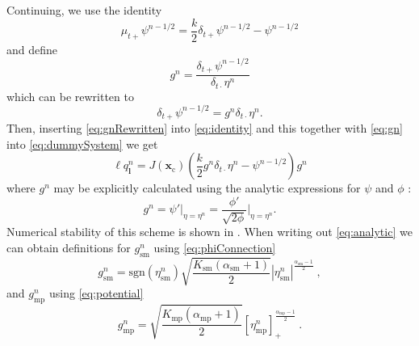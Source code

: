 \documentclass[dvipsnames, pdftex]{article}
\def\ugen{q}
\begin{document}
Continuing, we use the identity 
\begin{equation}\label{eq:identity}
    \mu_{t+}\psi^{n-1/2} = \frac{k}{2}\delta_{t+}\psi^{n-1/2}-\psi^{n-1/2}
\end{equation}
and define
\begin{equation}\label{eq:gn}
    g^n = \frac{\delta_{t+}\psi^{n-1/2}}{\delta_{t\cdot}\eta^n}
\end{equation}
which can be rewritten to
\begin{equation}\label{eq:gnRewritten}
    \delta_{t+}\psi^{n-1/2} = g^n\delta_{t\cdot}\eta^n.
\end{equation}
Then, inserting \eqref{eq:gnRewritten} into \eqref{eq:identity} and this together with \eqref{eq:gn} into \eqref{eq:dummySystem} we get
\begin{equation}\label{eq:inserted}
    \ell \ugen^n_{\boldsymbol{l}} = J(\boldsymbol{x}_\text{c})\left(\frac{k}{2}g^n\delta_{t\cdot}\eta^n-\psi^{n-1/2}\right)g^n
\end{equation}
where $g^n$ may be explicitly calculated using the analytic expressions for $\psi$ and $\phi$ \cite{Ducceschi2019}:
\begin{equation}\label{eq:analytic}
    g^n = \psi'\bigg\rvert_{\eta=\eta^n} = \frac{\phi'}{\sqrt{2\phi}}\bigg\rvert_{\eta=\eta^n}.
\end{equation}
Numerical stability of this scheme is shown in \cite{Ducceschi2019}. When writing out \eqref{eq:analytic} we can obtain definitions for $g_\text{sm}^n$ using \eqref{eq:phiConnection}
\begin{equation}\label{eq:gnSM}
    g_\text{sm}^n =\text{sgn}(\eta_\text{sm}^n)\sqrt{\frac{K_\text{sm}(\alpha_\text{sm}+1)}{2}}|\eta_\text{sm}^n|^{\frac{\alpha_\text{sm}-1}{2}}\ ,
\end{equation}
and $g_\text{mp}^n$ using \eqref{eq:potential}
\begin{equation}\label{eq:gnMP}
    g_\text{mp}^n =\sqrt{\frac{K_\text{mp}(\alpha_\text{mp} + 1)}{2}} [\eta_\text{mp}^n]_+^{\frac{\alpha_\text{mp} - 1}{2}}\ .
\end{equation} 
\end{document}
